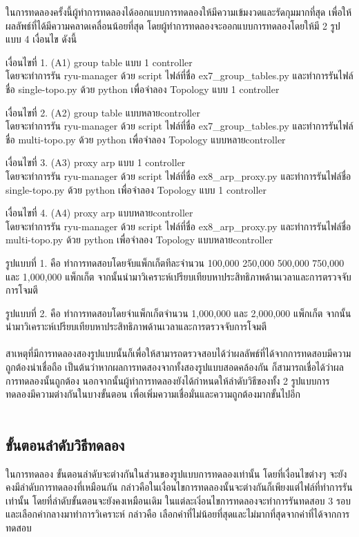 ในการทดลองครั้งนี้ผู้ทำการทดลองได้ออกแบบการทดลองให้มีความเข้มงวดและรัดกุมมากที่สุด เพื่อให้ผลลัพธ์ที่ได้มีความคลาดเคลื่อนน้อยที่สุด
โดยผู้ทำการทดลองจะออกแบบการทดลองโดยให้มี 2 รูปแบบ 4 เงื่อนไข ดังนี้


เงื่อนไขที่ 1. (A1) group table แบบ 1 \gls{controller}\\
โดยจะทำการรัน ryu-manager ด้วย script ไฟล์ที่ชื่อ ex7\_group\_tables.py 
และทำการรันไฟล์ชื่อ single-topo.py ด้วย python เพื่อจำลอง Topology แบบ 1 \gls{controller}


เงื่อนไขที่ 2. (A2) group table แบบหลาย\gls{controller} \\
โดยจะทำการรัน ryu-manager ด้วย script ไฟล์ที่ชื่อ ex7\_group\_tables.py 
และทำการรันไฟล์ชื่อ multi-topo.py ด้วย python เพื่อจำลอง Topology แบบหลาย\gls{controller}


เงื่อนไขที่ 3. (A3) proxy arp แบบ 1 \gls{controller}\\
โดยจะทำการรัน ryu-manager ด้วย script ไฟล์ที่ชื่อ ex8\_arp\_proxy.py
และทำการรันไฟล์ชื่อ single-topo.py ด้วย python เพื่อจำลอง Topology แบบ 1 \gls{controller}

เงื่อนไขที่ 4. (A4) proxy arp แบบหลาย\gls{controller} \\
โดยจะทำการรัน ryu-manager ด้วย script ไฟล์ที่ชื่อ ex8\_arp\_proxy.py 
และทำการรันไฟล์ชื่อ multi-topo.py ด้วย python เพื่อจำลอง Topology แบบหลาย\gls{controller}

รูปแบบที่ 1. คือ ทำการทดสอบโดยจับแพ็กเก็ตทีละจำนวน 100,000 250,000 500,000 750,000 และ 1,000,000 แพ็กเก็ต
จากนั้นนำมาวิเคราะห์เปรียบเทียบหาประสิทธิภาพด้านเวลาและการตรวจจับการโจมตี

รูปแบบที่ 2. คือ ทำการทดสอบโดยจำแพ็กเก็ตจำนวน 1,000,000 และ 2,000,000 แพ็กเก็ต
จากนั้นนำมาวิเคราะห์เปรียบเทียบหาประสิทธิภาพด้านเวลาและการตรวจจับการโจมตี
\\\\
สาเหตุที่มีการทดลองสองรูปแบบนั้นก็เพื่อให้สามารถตรวจสอบได้ว่าผลลัพธ์ที่ได้จากการทดสอบมีความถูกต้องน่าเชื่อถือ
เป็นต้นว่าหากผลการทดสองจากทั้งสองรูปแบบสอดคล้องกัน ก็สามารถเชื่อได้ว่าผลการทดลองนั้นถูกต้อง นอกจากนั้นผู้ทำการทดลองยังได้กำหนดให้ลำดับวิธีของทั้ง 2 รูปแบบการทดลองมีความต่างกันในบางขั้นตอน เพื่อเพิ่มความเชื่อมั่นและความถูกต้องมากขั้นไปอีก
\\\\
\subsection{ขั้นตอนลำดับวิธีทดลอง}
\indent\indent
ในการทดลอง ขั้นตอนลำดับจะต่างกันในส่วนของรูปแบบการทดลองเท่านั้น โดยที่เงื่อนไขต่างๆ จะยังคงมีลำดับการทดลองที่เหมือนกัน กล่าวคือในเงื่อนไขการทดลองนั้นจะต่างกันก็เพียงแต่ไฟล์ที่ทำการรันเท่านั้น โดยที่ลำดับขั้นตอนจะยังคงเหมือนเดิม 
ในแต่ละเงิ่อนไขการทดลองจะทำการรันทดสอบ 3 รอบ และเลือกค่ากลางมาทำการวิเคราะห์ กล่าวคือ เลือกค่าที่ไม่น้อยที่สุดและไม่มากที่สุดจากค่าที่ได้จากการทดสอบ

